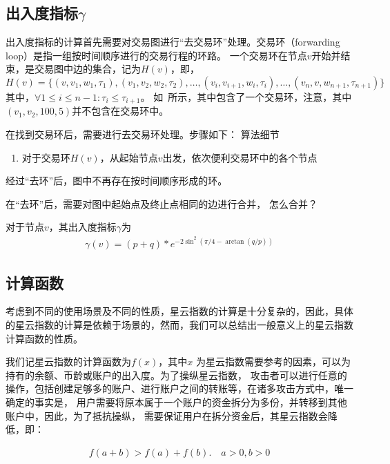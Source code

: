 \subsection*{出入度指标$\gamma$}
出入度指标的计算首先需要对交易图进行“去交易环”处理。交易环（forwarding loop）是指一组按时间顺序进行的交易行程的环路。
一个交易环在节点$v$开始并结束，是交易图中边的集合，记为$H(v)$，即，
\[
H(v) = \{(v, v_1, w_1, \tau_1), (v_1, v_2, w_2, \tau_2), \dots, (v_i, v_{i+1}, w_{i}, \tau_i), \dots, (v_n, v, w_{n+1}, \tau_{n+1})\}
\]
\noindent 其中，$\forall 1\le i \le {n-1} : \tau_i \le \tau_{i+1} $。
\noindent 如~所示，其中包含了一个交易环，注意，其中$(v_1, v_2, 100, 5)$并不包含在交易环中。



在找到交易环后，需要进行去交易环处理。步骤如下：{\color{red} 算法细节}
\begin{enumerate}
\item 对于交易环$H(v)$，从起始节点$v$出发，依次便利交易环中的各个节点
\end{enumerate}




经过“去环”后，图中不再存在按时间顺序形成的环。

在“去环”后，需要对图中起始点及终止点相同的边进行合并，{\color{red} 怎么合并？}


对于节点$v$，其出入度指标$\gamma$为
\begin{align}
\gamma(v) = (p + q) * e^{-2\sin^2{(\pi/4 - \arctan(q/p))}}
\end{align}

\subsection*{计算函数}
考虑到不同的使用场景及不同的性质，星云指数的计算是十分复杂的，因此，具体的星云指数的计算是依赖于场景的，然而，我们可以总结出一般意义上的星云指数计算函数的性质。

我们记星云指数的计算函数为\(f(x)\)，其中\(x\)
为星云指数需要参考的因素，可以为持有的余额、币龄或账户的出入度。为了操纵星云指数，
攻击者可以进行任意的操作，包括创建足够多的账户、进行账户之间的转账等，在诸多攻击方式中，唯一确定的事实是，
{\color{red} 用户需要将原本属于一个账户的资金拆分为多份，并转移到其他账户中}，因此，为了抵抗操纵，
需要保证用户在拆分资金后，其星云指数会降低，即：

\begin{align}
f(a + b) > f(a) + f(b).\quad a>0, b>0
\end{align}

